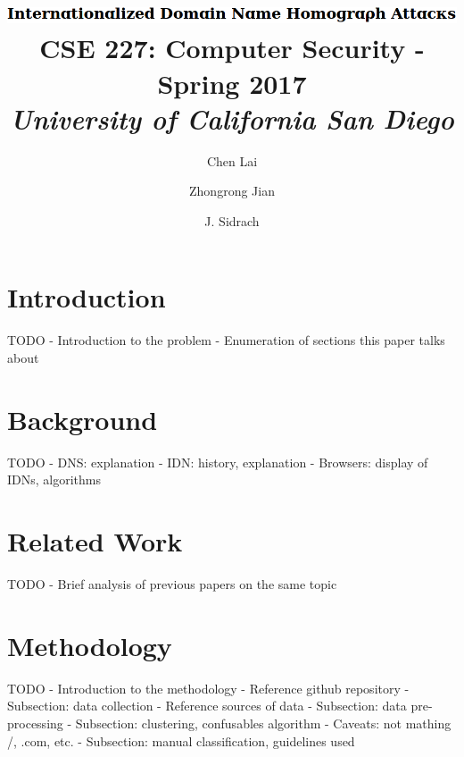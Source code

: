 \documentclass[letterpaper,twocolumn,10pt]{article}
\begin{document}
\date{}

\title{\Large
\includegraphics[height=\baselineskip]{title}
\\ \vspace{0.025 in} \large \normalfont
CSE 227: Computer Security - Spring 2017 \\ \textit{
University of California San Diego
}}

\author{
{\rm Chen Lai}\\
\and
{\rm Zhongrong Jian}\\
\and
{\rm J. Sidrach}\\
}

\maketitle


\section{Introduction}
TODO
- Introduction to the problem
- Enumeration of sections this paper talks about

\section{Background}
TODO
- DNS: explanation
- IDN: history, explanation
- Browsers: display of IDNs, algorithms

\section{Related Work}
TODO
- Brief analysis of previous papers on the same topic

\section{Methodology}
TODO
- Introduction to the methodology
  - Reference github repository
- Subsection: data collection
  - Reference sources of data
- Subsection: data pre-processing
- Subsection: clustering, confusables algorithm
  - Caveats: not mathing /, .com, etc.
- Subsection: manual classification, guidelines used
\end{document}
